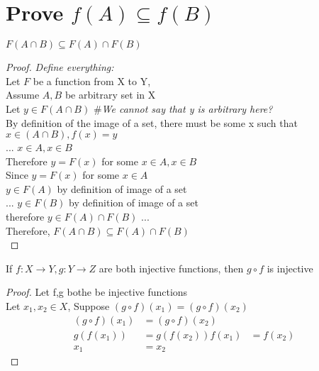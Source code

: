 \documentclass[a4paper]{article}
\begin{document}
\section{Prove $f(A) \subseteq f(B)$}
\begin{ex}
    $F(A\cap B) \subseteq F(A) \cap F(B)$
\begin{proof}
    \textit{Define everything:}\\
    Let $F$ be a function from X to Y, \\
    Assume $A, B$ be arbitrary set in X\\
    Let $y \in F(A \cap B)$         \textit{$\#$We cannot say that y is arbitrary here?}\\
    By definition of the image of a set, there must be some x such that $x\in (A \cap B), f(x) = y$\\
    ... $x \in A, x \in B$\\
    Therefore $y = F(x)$ for some $x \in A, x \in B$\\
    Since $y = F(x)$ for some $x \in A$\\
    $y \in F(A)$ by definition of image of a set\\
    ... $y \in F(B)$ by definition of image of a set\\
    therefore $y \in F(A) \cap F(B)$ ...\\
    Therefore, $F(A \cap B) \subseteq F(A) \cap F(B)$\\
\end{proof}
\end{ex}





\begin{thm}
    If $f: X \rightarrow Y, g: Y \rightarrow Z $ are both injective functions, then $g \circ f$ is injective
\end{thm}
\begin{proof}
    Let f,g bothe be injective functions\\
    Let $x_1,x_2 \in X$, Suppose $(g\circ f)(x_1) = (g \circ f)(x_2)$\\
\begin{align*}
    (g\circ f)(x_1) &= (g \circ f) (x_2)\\
    g(f(x_1)) &= g(f(x_2))
    f(x_1) &= f(x_2)\\
    x_1 &= x_2
\end{align*}
\end{proof}
\end{document}
